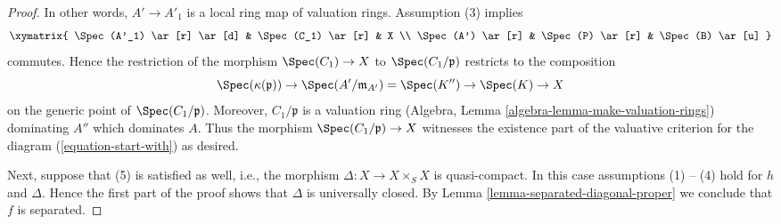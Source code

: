 \begin{proof}
In other words, $A' \to A'_1$ is a local ring map of valuation
rings. Assumption (3) implies
$$
\xymatrix{
\Spec(A'_1) \ar[r] \ar[d] & \Spec(C_1) \ar[r] & X \\
\Spec(A') \ar[r] & \Spec(P) \ar[r] & \Spec(B) \ar[u]
}
$$
commutes. Hence the restriction of the morphism $\Spec(C_1) \to X$
to $\Spec(C_1/\mathfrak p)$ restricts to the composition
$$
\Spec(\kappa(\mathfrak p)) \to
\Spec(A'/\mathfrak m_{A'}) = \Spec(K'') \to
\Spec(K) \to X
$$
on the generic point of $\Spec(C_1/\mathfrak p)$. Moreover,
$C_1/\mathfrak p$ is a valuation ring
(Algebra, Lemma \ref{algebra-lemma-make-valuation-rings})
dominating $A''$ which dominates $A$.
Thus the morphism $\Spec(C_1/\mathfrak p) \to X$ witnesses the
existence part of the valuative criterion for the diagram
(\ref{equation-start-with}) as desired.

\medskip\noindent
Next, suppose that (5) is satisfied as well, i.e., the morphism
$\Delta : X \to X \times_S X$ is quasi-compact. In this case
assumptions (1) -- (4) hold for $h$ and $\Delta$. Hence the first
part of the proof shows that $\Delta$ is universally closed.
By Lemma \ref{lemma-separated-diagonal-proper} we conclude that
$f$ is separated.
\end{proof}
